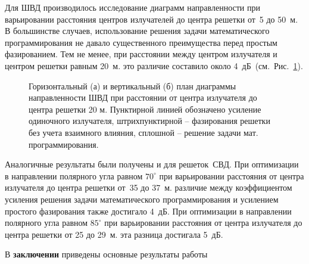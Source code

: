 Для ШВД производилось исследование диаграмм направленности при варьировании расстояния центров излучателей до центра решетки от~5 до 50~м. В большинстве случаев, использование решения задачи математического программирования не давало существенного преимущества перед простым фазированием. Тем не менее, при расстоянии между центром излучателя и центром решетки равным 20~м. это различие составило около 4~дБ~(см.~Рис.~\ref{pic:r_bvd_result_0}).

\begin{figure}
\begin{minipage}[h]{0.49\linewidth}
\end{minipage}
\hfill
\begin{minipage}[h]{0.49\linewidth}
\end{minipage}
\caption{Горизонтальный (а) и вертикальный (б) план диаграммы направленности ШВД при расстоянии от центра излучателя до центра решетки 20 м. Пунктирной линией обозначено усиление одиночного излучателя, штрихпунктирной – фазирования решетки без учета взаимного влияния, сплошной – решение задачи мат. программирования.}
\label{pic:r_bvd_result_0}
\end{figure}

Аналогичные результаты были получены и для решеток~СВД. При оптимизации в направлении полярного угла равном $70^{\circ}$ при варьировании расстояния от центра излучателя до центра решетки от~35 до 37~м. различие между коэффициентом усиления решения задачи математического программирования и усилением простого фазирования также достигало 4~дБ.  При оптимизации в направлении полярного угла равном $85^{\circ}$ при варьировании расстояния от центра излучателя до центра решетки от 25 до 29~м. эта разница достигала 5~дБ.

\FloatBarrier
{}                                  %
В {\textbf{заключении}} приведены основные результаты работы


